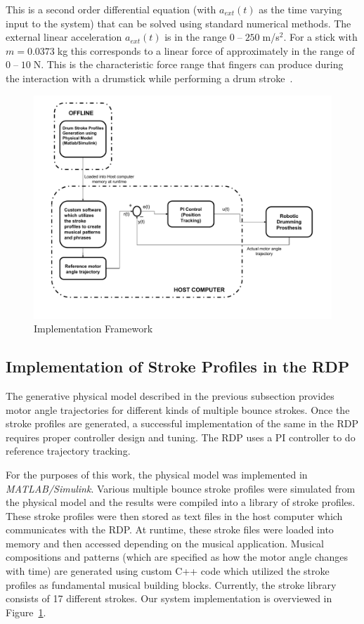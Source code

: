 \documentclass[final,1p,times]{elsarticle}
\begin{document}
This is a second order differential equation (with $a_{ext}(t)$ as the time varying input to the system) that can be solved using standard numerical methods. The external linear acceleration $a_{ext}(t)$ is in the range $0\;$--$\;250\;$m/s$^2$. For a stick with $m = 0.0373\;$kg this corresponds to a linear force of approximately in the range of $0\;$--$\;10\;$N. This is the characteristic force range that fingers can produce during the interaction with a drumstick while performing a drum stroke~\cite{hajian1997characterization}. 
\begin{figure}[H]
	\begin{center}
		\includegraphics[width = 1.02\hsize]{./figures/Fig3.pdf}
		\caption{Implementation Framework}
		\label{FW}
	\end{center}
\end{figure}
\subsection{Implementation of Stroke Profiles in the RDP}
The generative physical model described in the previous subsection provides motor angle trajectories for different kinds of multiple bounce strokes. Once the stroke profiles are generated, a successful implementation of the same in the RDP requires proper controller design and tuning. The RDP uses a PI controller to do reference trajectory tracking. 

For the purposes of this work, the physical model was implemented in \textit{MATLAB/Simulink}. Various multiple bounce stroke profiles were simulated from the physical model and the results were compiled into a library of stroke profiles. These stroke profiles were then stored as text files in the host computer which communicates with the RDP. At runtime, these stroke files were loaded into memory and then accessed depending on the musical application. Musical compositions and patterns (which are specified as how the motor angle changes with time) are generated using custom C++ code which utilized the stroke profiles as fundamental musical building blocks. Currently, the stroke library consists of 17 different strokes. Our system implementation is overviewed in Figure~\ref{FW}.
\end{document}
